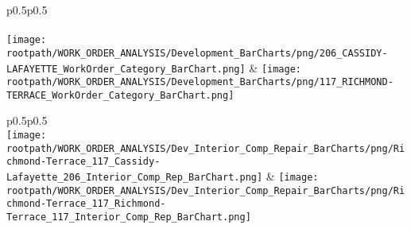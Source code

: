 \begin{center}
                                \tablehead{\hspace{1cm}\\}
                                \tabletail{\hspace{1cm}\\}
                                \begin{supertabular}{p{0.5\textwidth}p{0.5\textwidth}}
                                \shrinkheight{1in}
                                 \\
                                 \\
                                \texttt{[image: \\rootpath/WORK\_ORDER\_ANALYSIS/Development\_BarCharts/png/206\_CASSIDY-LAFAYETTE\_WorkOrder\_Category\_BarChart.png]} & \texttt{[image: \\rootpath/WORK\_ORDER\_ANALYSIS/Development\_BarCharts/png/117\_RICHMOND-TERRACE\_WorkOrder\_Category\_BarChart.png]} \\
                                        \end{supertabular}
\end{center}

                        \begin{center}
                        \tablehead{\hspace{1cm}\\}
                        \tabletail{\hspace{1cm}\\}
                        \begin{supertabular}{p{0.5\textwidth}p{0.5\textwidth}}
                         \\
                        \texttt{[image: \\rootpath/WORK\_ORDER\_ANALYSIS/Dev\_Interior\_Comp\_Repair\_BarCharts/png/Richmond-Terrace\_117\_Cassidy-Lafayette\_206\_Interior\_Comp\_Rep\_BarChart.png]} & \texttt{[image: \\rootpath/WORK\_ORDER\_ANALYSIS/Dev\_Interior\_Comp\_Repair\_BarCharts/png/Richmond-Terrace\_117\_Richmond-Terrace\_117\_Interior\_Comp\_Rep\_BarChart.png]} \\
                                         \\
\end{supertabular}
\end{center}

